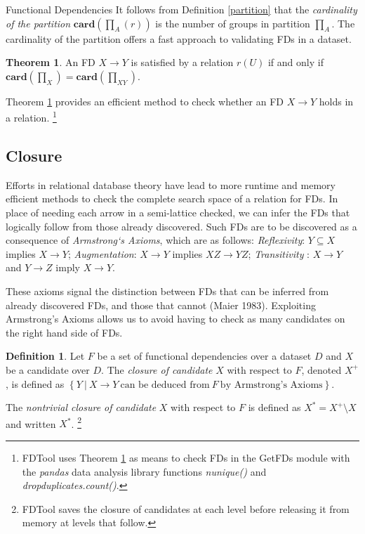 \documentclass[6pt,twoside]{article}
\theoremstyle{plain}
\theoremstyle{definition}
\newtheorem{defn}{Definition}[section]
\newtheorem{thm}{Theorem}[section]
\begin{document}
\begin{section}{Functional Dependencies}
It follows from Definition \ref{partition} that the \textit{cardinality of the partition} $\mathbf{card}(\prod_{A} (r))$ is the number of groups in partition $\prod_{A}$. The cardinality of the partition offers a fast approach to validating FDs in a dataset.

\begin{thm}
	\label{valFD}
	An FD $X \rightarrow Y$ is satisfied by a relation $r(U)$ if and only if $\mathbf{card}(\prod_X) = \mathbf{card}(\prod_{XY})$.
\end{thm}

Theorem \ref{valFD} provides an efficient method to check whether an FD $X \rightarrow Y$ holds in a relation. \footnote{FDTool uses Theorem \ref{valFD} as means to check FDs in the GetFDs module with the \textit{pandas} data analysis library functions \textit{nunique()} and \textit{dropduplicates.count()}.}

\subsection[closure]{Closure}

Efforts in relational database theory have lead to more runtime and memory efficient methods to check the complete search space of a relation for FDs. In place of needing each arrow in a semi-lattice checked, we can infer the FDs that logically follow from those already discovered. Such FDs are to be discovered as a consequence of \textit{Armstrong`s Axioms}, which are as follows: \textit{Reflexivity}: $Y \subseteq X$ implies $X \rightarrow Y$; \textit{Augmentation}: $X \rightarrow Y$ implies $XZ \rightarrow YZ$; \textit{Transitivity
}: $ X \rightarrow Y$ and $Y \rightarrow Z$ imply $X \rightarrow Y$. 

These axioms signal the distinction between FDs that can be inferred from already discovered FDs, and those that cannot (Maier 1983). Exploiting Armstrong's Axioms allows us to avoid having to check as many candidates on the right hand side of FDs.

\begin{defn}
	\label{closure}
	Let $F$ be a set of functional dependencies over a dataset $D$ and $X$ be a candidate over $D$. The \textit{closure of candidate} $X$ with respect to $F$, denoted $X^{+}$, is defined as $ \left\{  Y \ | \  X \rightarrow Y \  \text{can be deduced from} \ F \ \text{by Armstrong's Axioms} \right\}$.
\end{defn}

The \textit{nontrivial closure of candidate} $X$ with respect to $F$ is defined as $X^{*} = X^{+} \setminus X$ and written $X^{*}$. \footnote{FDTool saves the closure of candidates at each level before releasing it from memory at levels that follow.}

\end{section}
\end{document}
